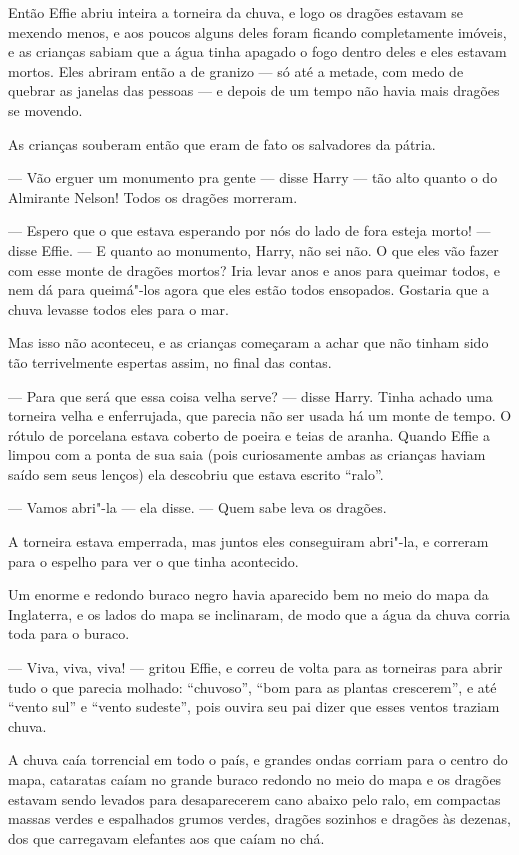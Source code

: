 Então Effie abriu inteira a torneira da chuva, e logo os dragões
estavam se mexendo menos, e aos poucos alguns deles foram ficando
completamente imóveis, e as crianças sabiam que a água tinha apagado
o fogo dentro deles e eles estavam mortos. Eles abriram então a de
granizo --- só até a metade, com medo de quebrar as janelas das pessoas
--- e depois de um tempo não havia mais dragões se movendo.

As crianças souberam então que eram de fato os salvadores da pátria.

--- Vão erguer um monumento pra gente --- disse Harry --- tão alto quanto
o do Almirante Nelson! Todos os dragões morreram.

--- Espero que o que estava esperando por nós do lado de fora esteja
morto! --- disse Effie. --- E quanto ao monumento, Harry, não sei não. O
que eles vão fazer com esse monte de dragões mortos? Iria levar anos
e anos para queimar todos, e nem dá para queimá"-los agora que eles
estão todos ensopados. Gostaria que a chuva levasse todos eles para o
mar.

Mas isso não aconteceu, e as crianças começaram a achar que não tinham
sido tão terrivelmente espertas assim, no final das contas.

--- Para que será que essa coisa velha serve? --- disse Harry. Tinha
achado uma torneira velha e enferrujada, que parecia não ser usada há
um monte de tempo. O rótulo de porcelana estava coberto de
poeira e teias de aranha. Quando Effie a limpou com a ponta de sua
saia (pois curiosamente ambas as crianças haviam saído sem seus
lenços) ela descobriu que estava escrito “ralo”.

--- Vamos abri"-la --- ela disse. --- Quem sabe leva os dragões.

A torneira estava emperrada, mas juntos eles conseguiram 
abri"-la, e correram para o espelho para ver o que tinha acontecido.

Um enorme e redondo buraco negro havia aparecido bem no meio do
mapa da Inglaterra, e os lados do mapa se inclinaram, de modo que a
água da chuva corria toda para o buraco.

--- Viva, viva, viva! --- gritou Effie, e correu de volta para as
torneiras para abrir tudo o que parecia molhado: “chuvoso”, “bom para
as plantas crescerem”, e até “vento sul” e “vento sudeste”, pois
ouvira seu pai dizer que esses ventos traziam chuva.

A chuva caía torrencial em todo o país, e grandes ondas
corriam para o centro do mapa, cataratas caíam no grande
buraco redondo no meio do mapa e os dragões estavam sendo levados
para desaparecerem cano abaixo pelo ralo, em compactas massas verdes
e espalhados grumos verdes, dragões sozinhos e dragões às dezenas,
dos que carregavam elefantes aos que caíam no chá.

